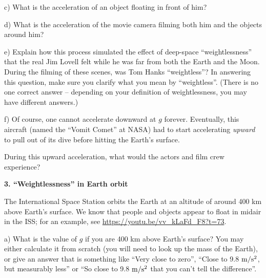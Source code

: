 \documentclass[12pt]{article}
\begin{document}
\begin{minipage}{0.475\textwidth}
	c) What is the acceleration of an object floating in front of him?
\end{minipage}
\hspace{0.05\textwidth}
\begin{minipage}{0.475\textwidth}
	
	d) What is the acceleration of the movie camera filming both him and the objects around him?

\end{minipage}
\vspace{1in}

\newpage

e) Explain how this process simulated the effect of deep-space ``weightlessness'' that the real Jim Lovell felt while he was far from both the Earth and the Moon. During the filming of these scenes, was Tom Hanks ``weightless''? In answering this question, make sure you clarify what you mean by ``weightless''. (There is no one correct answer -- depending on your definition of weightlessness, you may have different answers.)

\vspace{3in}

f) Of course, one cannot accelerate downward at $g$ forever. Eventually, this aircraft (named the ``Vomit Comet'' at NASA) had to start accelerating {\it upward} to pull out of its dive before hitting the Earth's surface. 

During this upward acceleration, what would the actors and film crew experience?

\newpage

{\bf 3. ``Weightlessness'' in Earth orbit}

The International Space Station orbits the Earth at an altitude of around 400 km above Earth's surface. We know that people and objects appear to float in midair in the ISS; for an example, see \url{https://youtu.be/vv_kLaFd_F8?t=73}.

a) What is the value of $g$ if you are 400 km above Earth's surface? You may either calculate it from scratch (you will need to look up the mass of the Earth), or give an answer that is something like ``Very close to zero'', ``Close to 9.8 $\rm m/\rm s^2$, but measurably less'' or ``So close to 9.8 $\rm m/\rm s^2$ that you can't tell the difference''.

\vspace{1.5in}
\end{document}
